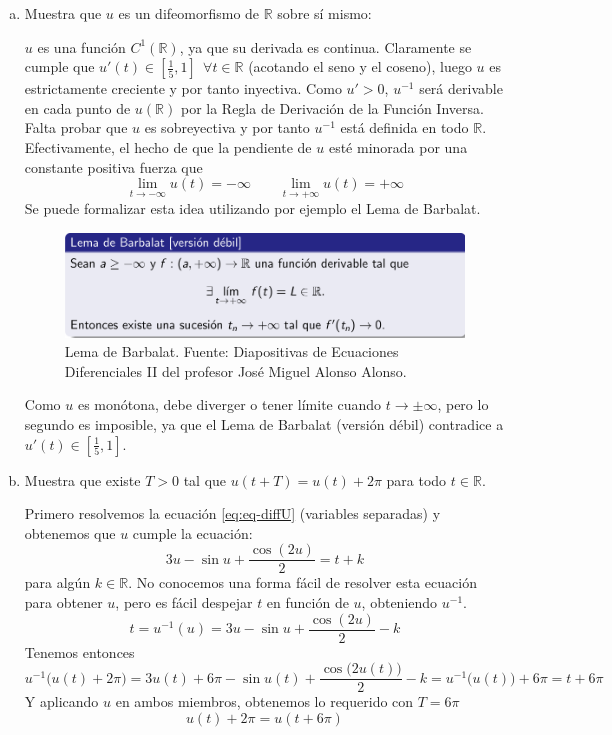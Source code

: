 \documentclass[12pt,spanish]{article}
\theoremstyle{definition}
\theoremstyle{remark}
\begin{document}
  \begin{enumerate}[a)]
  \item Muestra que $u$ es un difeomorfismo de $\mathbb{R}$ sobre sí
    mismo:

    $u$ es una función $C^1(\mathbb{R})$, ya que su derivada es
    continua. Claramente se cumple que
    $u'(t)\in [\frac{1}{5},1]\ \ \forall t\in\mathbb{R}$ (acotando el
    seno y el coseno), luego $u$ es estrictamente creciente y por
    tanto inyectiva. Como $u'>0$, $u^{-1}$ será derivable en cada
    punto de $u(\mathbb{R})$ por la Regla de Derivación de la Función
    Inversa. Falta probar que $u$ es sobreyectiva y por tanto $u^{-1}$
    está definida en todo $\mathbb{R}$. Efectivamente, el hecho de que
    la pendiente de $u$ esté minorada por una constante positiva
    fuerza que
    \[\lim_{t\to-\infty}u(t)=-\infty\qquad \lim_{t\to+\infty}u(t)=+\infty\]
    Se puede formalizar esta idea utilizando por ejemplo el Lema de Barbalat.
    \begin{figure}[H]
      \centering
      \includegraphics[width=140mm]{barbalat}
      \caption{Lema de Barbalat. Fuente: Diapositivas de Ecuaciones Diferenciales II del profesor José Miguel Alonso Alonso.}
      \label{fig:barbalat}
    \end{figure}
    Como $u$ es monótona, debe diverger o tener límite cuando
    $t\to \pm\infty$, pero lo segundo es imposible, ya que el Lema de
    Barbalat (versión débil) contradice a $u'(t)\in [\frac{1}{5},1]$.
    
  \item Muestra que existe $T>0$ tal que $u(t+T)=u(t)+2\pi$ para todo
    $t\in\mathbb{R}$.

    Primero resolvemos la ecuación \ref{eq:eq-diffU} (variables separadas) y obtenemos
    que $u$ cumple la ecuación:
    \begin{equation} \label{eq:eqU} 3u-\sin u + \frac{\cos(2u)}{2}=t+k
    \end{equation}
    para algún $k\in\mathbb{R}$. No conocemos una forma fácil de
    resolver esta ecuación para obtener $u$, pero es fácil despejar
    $t$ en función de $u$, obteniendo $u^{-1}$.
    \begin{equation} \label{eq:u-1} t=u^{-1}(u)=3u-\sin u +
      \frac{\cos(2u)}{2}-k
    \end{equation}
    Tenemos entonces
    \[u^{-1}\big(u(t)+2\pi\big)=3u(t)+6\pi -\sin u(t)
      +\frac{\cos\big(2u(t)\big)}{2}-k=u^{-1}\big(u(t)\big)+6\pi=t+6\pi\]
    Y aplicando $u$ en ambos miembros, obtenemos lo requerido con
    $T=6\pi$
    \[u(t)+2\pi=u(t+6\pi)\]
    

\end{enumerate}
\end{document}
